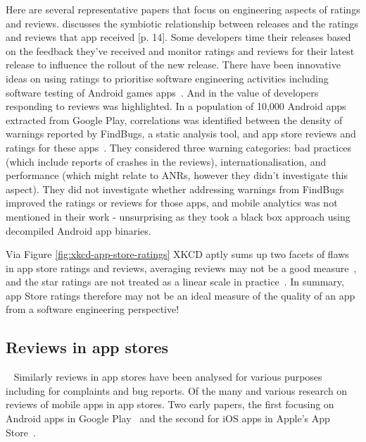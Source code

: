 Here are several representative papers that focus on engineering aspects of ratings and reviews.  \textcite{alsubaihin2019app_store_effects_on_software_engineering} discusses the symbiotic relationship between releases and the ratings and reviews that app received [p. 14]. Some developers time their releases based on the feedback they've received and monitor ratings and reviews for their latest release to influence the rollout of the new release. There have been innovative ideas on using ratings to prioritise software engineering activities including software testing of Android games apps~. And in \textcite{greenheld2018_automating_developers_responses_to_app_reviews} the value of developers responding to reviews was highlighted. 
In a population of 10,000 Android apps extracted from Google Play, correlations was identified between the density of warnings reported by FindBugs, a static analysis tool, and app store reviews and ratings for these apps~. They considered three warning categories: bad practices (which include reports of crashes in the reviews), internationalisation, and performance (which might relate to ANRs, however they didn't investigate this aspect). They did not investigate whether addressing warnings from FindBugs improved the ratings or reviews for those apps, and mobile analytics was not mentioned in their work - unsurprising as they took a black box approach using decompiled Android app binaries.

Via Figure \ref{fig:xkcd-app-store-ratings} XKCD aptly sums up two facets of flaws in app store ratings and reviews, averaging reviews may not be a good measure~, and the star ratings are not treated as a linear scale in practice~. In summary, app Store ratings therefore may not be an ideal measure of the quality of an app from a software engineering perspective! 

\FloatBarrier

\subsection{Reviews in app stores}~\label{rw-reviews-in-app-stores}
Similarly reviews in app stores have been analysed for various purposes including for complaints and bug reports. Of the many and various research on reviews of mobile apps in app stores. 
Two early papers, the first focusing on Android apps in Google Play~\textcite{fu2013_why_people_hate_your_app_making_sense_of_user_feedback_in_a_mobile_app_store} and the second for iOS apps in Apple's App Store~\textcite{khalid2015_what_do_mobile_app_users_complain_about}.

